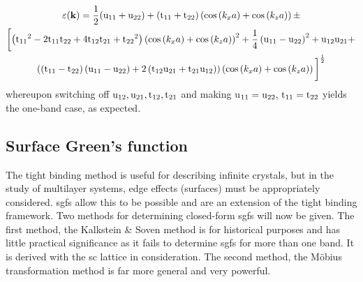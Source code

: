 \documentclass[a4paper, 12pt]{article}
\begin{document}
	\begin{multline}
		\varepsilon({\bf k}) =\frac{1}{2}({\rm u}_{11}+{\rm u}_{22})+\left({\rm t_{11}+t_{22}}\right)\left(\cos \left( k_x a \right)+ \cos \left( k_z a \right) \right)
 \pm\\
\left[ {\rm\left( {t_{{11}}}^{2}-2t_{{11}}t_{{22}}+4t_{{12}}
t_{{21}}+{t_{{22}}}^{2} \right)}  \left( \cos \left({k_xa}\right) +\cos \left({k_za}\right) 
\right) ^{2}+ \rm\frac{1}{4}\left({u_{{11}}}-u_{{22}}\right)^2+u_{{12}}u_{{21}}+\right.\\\left(  \left(\rm  t_{{11}}-t_{{22}} \right) \left(\rm u_{{11}}
- u_{{22}}\right)+\rm2\left(t_{{12}}u_{{21}}
+t_{{21}}u_{{12}}\right) \right)\left(\cos \left( k_xa \right)+ \cos \left( k_za \right)\right) \bigg]^{\frac{1}{2}}
	\end{multline}
	whereupon switching off $\rm u_{12}, u_{21}, t_{12}, t_{21}$ and making u$_{11} = \rm u_{22}, \, t_{11} = t_{22}$ yields the one-band case, as expected.
	

	\subsection{Surface Green's function}
	The tight binding method is useful for describing infinite crystals, but in the study of multilayer systems, edge effects (surfaces) must be appropriately considered.
	\Glspl{sgf} allow this to be possible and are an extension of the tight binding framework.
	Two methods for determining closed-form \gls{sgf}s will now be given. The first method, the Kalkstein \& Soven method is for historical purposes and has little practical significance as it fails to determine \gls{sgf}s for more than one band. It is derived with the \gls{sc} lattice in consideration. The second method, the M\"{o}bius transformation method is far more general and very powerful.
\end{document}
